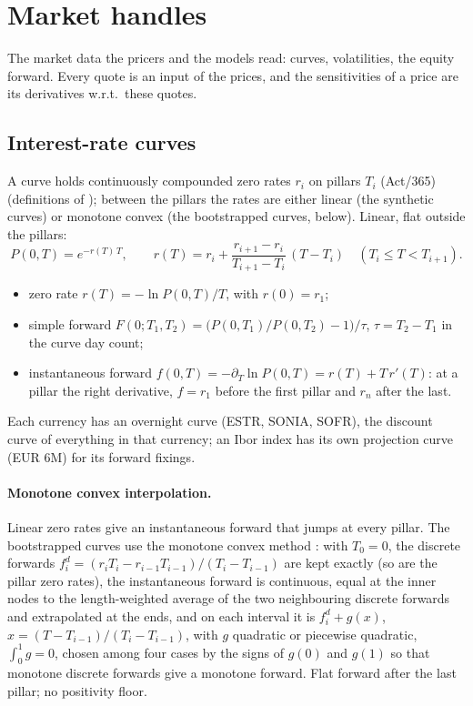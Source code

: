 \section{Market handles}\label{sec:mp-market}
The market data the pricers and the models read: curves, volatilities, the equity forward. Every quote is an input
of the prices, and the sensitivities of a price are its derivatives w.r.t.\ these quotes.

\subsection{Interest-rate curves}\label{sec:mp-curves}
A curve holds continuously compounded zero rates $r_i$ on pillars $T_i$ (Act/365) (definitions of
\citealp[ch.~1]{brigo2006}); between the pillars the rates are either linear (the synthetic curves) or monotone convex
(the bootstrapped curves, below). Linear, flat outside the pillars:
\[
  P(0,T) = e^{-r(T)\,T},\qquad r(T) = r_i + \frac{r_{i+1}-r_i}{T_{i+1}-T_i}\,(T - T_i)\quad (T_i \le T < T_{i+1}).
\]
\begin{itemize}[nosep]
  \item zero rate $r(T) = -\ln P(0,T)/T$, with $r(0) = r_1$;
  \item simple forward $F(0;T_1,T_2) = \big(P(0,T_1)/P(0,T_2) - 1\big)/\tau$, $\tau = T_2 - T_1$ in the curve day count;
  \item instantaneous forward $f(0,T) = -\partial_T \ln P(0,T) = r(T) + T\,r'(T)$: at a pillar the right derivative,
        $f = r_1$ before the first pillar and $r_n$ after the last.
\end{itemize}
Each currency has an overnight curve (ESTR, SONIA, SOFR), the discount curve of everything in that currency; an Ibor
index has its own projection curve (EUR 6M) for its forward fixings.

\paragraph{Monotone convex interpolation.} Linear zero rates give an instantaneous forward that jumps at every
pillar. The bootstrapped curves use the monotone convex method \citep{hagan2006}: with $T_0 = 0$, the discrete forwards
$f^d_i = (r_i T_i - r_{i-1} T_{i-1})/(T_i - T_{i-1})$ are kept exactly (so are the pillar zero rates), the instantaneous
forward is continuous, equal at the inner nodes to the length-weighted average of the two neighbouring discrete forwards
and extrapolated at the ends, and on each interval it is $f^d_i + g(x)$, $x = (T - T_{i-1})/(T_i - T_{i-1})$, with $g$
quadratic or piecewise quadratic, $\int_0^1 g = 0$, chosen among four cases by the signs of $g(0)$ and $g(1)$ so that
monotone discrete forwards give a monotone forward. Flat forward after the last pillar; no positivity floor.

